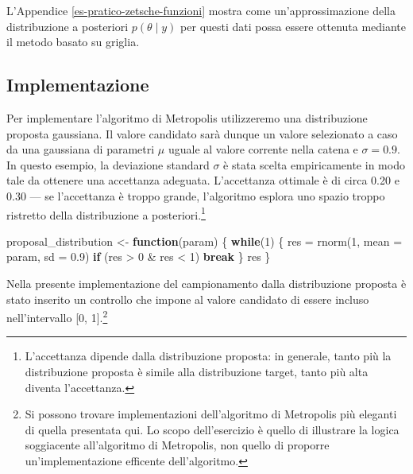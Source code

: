 \documentclass[
  11pt,
]{krantz}
\makeatletter
\newenvironment{Shaded}{\begin{snugshade}}{\end{snugshade}}
\newcommand{\AttributeTok}[1]{\textcolor[rgb]{0.61,0.61,0.61}{#1}}
\newcommand{\ControlFlowTok}[1]{\textcolor[rgb]{0.27,0.27,0.27}{\textbf{#1}}}
\newcommand{\DecValTok}[1]{\textcolor[rgb]{0.06,0.06,0.06}{#1}}
\newcommand{\FloatTok}[1]{\textcolor[rgb]{0.06,0.06,0.06}{#1}}
\newcommand{\FunctionTok}[1]{\textcolor[rgb]{0,0,0}{#1}}
\newcommand{\NormalTok}[1]{#1}
\newcommand{\OtherTok}[1]{\textcolor[rgb]{0.37,0.37,0.37}{#1}}
\newcommand{\SpecialCharTok}[1]{\textcolor[rgb]{0,0,0}{#1}}
\newenvironment{kframe}{%
\medskip{}
\setlength{\fboxsep}{.8em}
 \def\at@end@of@kframe{}%
 \ifinner\ifhmode%
  \def\at@end@of@kframe{\end{minipage}}%
  \begin{minipage}{\columnwidth}%
 \fi\fi%
 \def\FrameCommand##1{\hskip\@totalleftmargin \hskip-\fboxsep
 \colorbox{shadecolor}{##1}\hskip-\fboxsep
     \hskip-\linewidth \hskip-\@totalleftmargin \hskip\columnwidth}%
 \MakeFramed {\advance\hsize-\width
   \@totalleftmargin\z@ \linewidth\hsize
   \@setminipage}}%
 {\par\unskip\endMakeFramed%
 \at@end@of@kframe}
\renewenvironment{Shaded}{\begin{kframe}}{\end{kframe}}
\theoremstyle{definition}
\theoremstyle{definition}
\theoremstyle{definition}
\theoremstyle{definition}
\theoremstyle{remark}
\makeatother
\begin{document}
L'Appendice \ref{es-pratico-zetsche-funzioni} mostra come un'approssimazione della distribuzione a posteriori \(p(\theta \mid y)\) per questi dati possa essere ottenuta mediante il metodo basato su griglia.

\hypertarget{implementazione}{%
\subsection{Implementazione}\label{implementazione}}

Per implementare l'algoritmo di Metropolis utilizzeremo una distribuzione proposta gaussiana. Il valore candidato sarà dunque un valore selezionato a caso da una gaussiana di parametri \(\mu\) uguale al valore corrente nella catena e \(\sigma = 0.9\). In questo esempio, la deviazione standard \(\sigma\) è stata scelta empiricamente in modo tale da ottenere una accettanza adeguata. L'accettanza ottimale è di circa 0.20 e 0.30 --- se l'accettanza è troppo grande, l'algoritmo esplora uno spazio troppo ristretto della distribuzione a posteriori.\footnote{L'accettanza dipende dalla distribuzione proposta: in generale, tanto più la distribuzione proposta è simile alla distribuzione target, tanto più alta diventa l'accettanza.}

\begin{Shaded}
\begin{Highlighting}[]
\NormalTok{proposal\_distribution }\OtherTok{\textless{}{-}} \ControlFlowTok{function}\NormalTok{(param) \{}
  \ControlFlowTok{while}\NormalTok{(}\DecValTok{1}\NormalTok{) \{}
\NormalTok{    res }\OtherTok{=} \FunctionTok{rnorm}\NormalTok{(}\DecValTok{1}\NormalTok{, }\AttributeTok{mean =}\NormalTok{ param, }\AttributeTok{sd =} \FloatTok{0.9}\NormalTok{)}
    \ControlFlowTok{if}\NormalTok{ (res }\SpecialCharTok{\textgreater{}} \DecValTok{0} \SpecialCharTok{\&}\NormalTok{ res }\SpecialCharTok{\textless{}} \DecValTok{1}\NormalTok{)}
      \ControlFlowTok{break}
\NormalTok{  \}}
\NormalTok{  res}
\NormalTok{\}}
\end{Highlighting}
\end{Shaded}

Nella presente implementazione del campionamento dalla distribuzione proposta è stato inserito un controllo che impone al valore candidato di essere incluso nell'intervallo {[}0, 1{]}.\footnote{Si possono trovare implementazioni dell'algoritmo di Metropolis più eleganti di quella presentata qui. Lo scopo dell'esercizio è quello di illustrare la logica soggiacente all'algoritmo di Metropolis, non quello di proporre un'implementazione efficente dell'algoritmo.}
\end{document}
